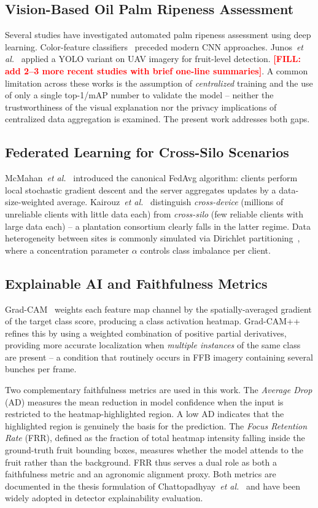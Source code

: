 \documentclass[a4paper,10pt]{article}
\newcommand{\tbd}[1]{\textcolor{red}{\textbf{[FILL: #1]}}}
\begin{document}
\subsection{Vision-Based Oil Palm Ripeness Assessment}
Several studies have investigated automated palm ripeness assessment using
deep learning. Color-feature classifiers~\cite{sabri2017} preceded modern CNN
approaches. Junos~\textit{et al.}~\cite{junos2022} applied a YOLO variant on
UAV imagery for fruit-level detection. \tbd{add 2--3 more recent studies with
brief one-line summaries}. A common limitation across these works is the
assumption of \emph{centralized} training and the use of only a single
top-1/mAP number to validate the model -- neither the trustworthiness of the
visual explanation nor the privacy implications of centralized data
aggregation is examined. The present work addresses both gaps.

\subsection{Federated Learning for Cross-Silo Scenarios}
McMahan~\textit{et al.}~\cite{fedavg} introduced the canonical FedAvg
algorithm: clients perform local stochastic gradient descent and the server
aggregates updates by a data-size-weighted average. Kairouz~\textit{et
al.}~\cite{kairouz2021} distinguish \textit{cross-device} (millions of
unreliable clients with little data each) from \textit{cross-silo} (few
reliable clients with large data each) -- a plantation consortium clearly
falls in the latter regime. Data heterogeneity between sites is commonly
simulated via Dirichlet partitioning~\cite{hsu2019}, where a concentration
parameter $\alpha$ controls class imbalance per client.

\subsection{Explainable AI and Faithfulness Metrics}
Grad-CAM~\cite{gradcam} weights each feature map channel by the
spatially-averaged gradient of the target class score, producing a class
activation heatmap. Grad-CAM++~\cite{gradcampp} refines this by using a
weighted combination of positive partial derivatives, providing more accurate
localization when \emph{multiple instances} of the same class are present --
a condition that routinely occurs in FFB imagery containing several bunches
per frame.

Two complementary faithfulness metrics are used in this work. The
\textit{Average Drop} (AD) measures the mean reduction in model confidence
when the input is restricted to the heatmap-highlighted region. A low AD
indicates that the highlighted region is genuinely the basis for the
prediction. The \textit{Focus Retention Rate} (FRR), defined as the fraction
of total heatmap intensity falling inside the ground-truth fruit bounding
boxes, measures whether the model attends to the fruit rather than the
background. FRR thus serves a dual role as both a faithfulness metric and an
agronomic alignment proxy. Both metrics are documented in the thesis
formulation of Chattopadhyay~\textit{et al.}~\cite{gradcampp} and have been
widely adopted in detector explainability evaluation.
\end{document}
